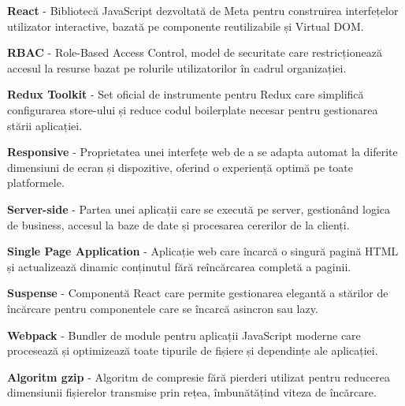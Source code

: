 \documentclass[12pt,a4paper]{report}
\begin{document}
\textbf{React} - Bibliotecă JavaScript dezvoltată de Meta pentru construirea interfețelor utilizator interactive, bazată pe componente reutilizabile și Virtual DOM.

\textbf{RBAC} - Role-Based Access Control, model de securitate care restricționează accesul la resurse bazat pe rolurile utilizatorilor în cadrul organizației.

\textbf{Redux Toolkit} - Set oficial de instrumente pentru Redux care simplifică configurarea store-ului și reduce codul boilerplate necesar pentru gestionarea stării aplicației.

\textbf{Responsive} - Proprietatea unei interfețe web de a se adapta automat la diferite dimensiuni de ecran și dispozitive, oferind o experiență optimă pe toate platformele.

\textbf{Server-side} - Partea unei aplicații care se execută pe server, gestionând logica de business, accesul la baze de date și procesarea cererilor de la clienți.

\textbf{Single Page Application} - Aplicație web care încarcă o singură pagină HTML și actualizează dinamic conținutul fără reîncărcarea completă a paginii.

\textbf{Suspense} - Componentă React care permite gestionarea elegantă a stărilor de încărcare pentru componentele care se încarcă asincron sau lazy.

\textbf{Webpack} - Bundler de module pentru aplicații JavaScript moderne care procesează și optimizează toate tipurile de fișiere și dependințe ale aplicației.

\textbf{Algoritm gzip} - Algoritm de compresie fără pierderi utilizat pentru reducerea dimensiunii fișierelor transmise prin rețea, îmbunătățind viteza de încărcare.
\end{document}
